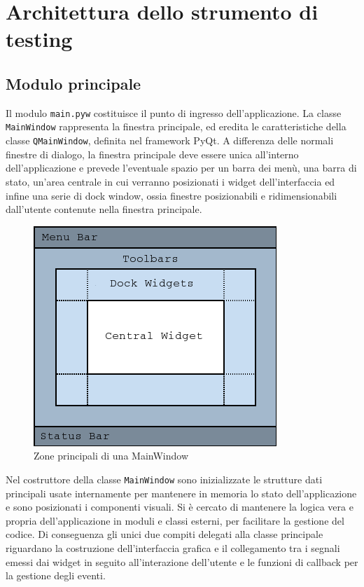 \chapter{Architettura dello strumento di testing}

\section{Modulo principale}

Il modulo \verb|main.pyw| costituisce il punto di ingresso dell'applicazione. La classe \verb|MainWindow| rappresenta la finestra principale, ed eredita le caratteristiche della classe \verb|QMainWindow|, definita nel framework PyQt. A differenza delle normali finestre di dialogo, la finestra principale deve essere unica all'interno dell'applicazione e prevede l'eventuale spazio per un barra dei menù, una barra di stato, un'area centrale in cui verranno posizionati i widget dell'interfaccia ed infine una serie di dock window, ossia finestre posizionabili e ridimensionabili dall'utente contenute nella finestra principale.

\begin{figure}[htbp]
\begin{center}
\includegraphics{images/mainwindowlayout.png}
\caption{Zone principali di una MainWindow}
\label{fig:pyqtMainWindow}
\end{center}
\end{figure}

Nel costruttore della classe \verb|MainWindow| sono inizializzate le strutture dati principali usate internamente per mantenere in memoria lo stato dell'applicazione e sono posizionati i componenti visuali. Si è cercato di mantenere la logica vera e propria dell'applicazione in moduli e classi esterni, per facilitare la gestione del codice. Di conseguenza gli unici due compiti delegati alla classe principale riguardano la costruzione dell'interfaccia grafica e il collegamento tra i segnali emessi dai widget in seguito all'interazione dell'utente e le funzioni di callback per la gestione degli eventi.

